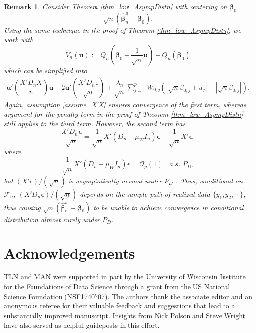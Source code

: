 \documentclass[ejs,authoryear,linksfromyear]{imsart}
\newcommand{\bnw}{\widehat{\bm{\beta}}_n^w} %
\numberwithin{equation}{section}
\theoremstyle{plain}
\newtheorem{remark}{Remark}[section]
\begin{document}
\begin{remark} \label{rmk_centering}
	Consider Theorem \ref{thm_low_AsympDistn} with centering on $\bm{\beta}_0$ 
	$$
	\sqrt{n} \left(
	\bnw - \bm{\beta}_0
	\right).
	$$     
	Using the same technique in the proof of Theorem \ref{thm_low_AsympDistn}, we work with
	$$
	V_n(\bm{u}) := 
	Q_n \left(
		\bm{\beta}_0 
		+ \dfrac{1}{\sqrt{n}} \bm{u}
	\right)
	- Q_n \left(
		\bm{\beta}_0 
	\right)
	$$
	which can be simplified into
	\begin{align*}
	\bm{u}' \left( \dfrac{X' D_n X}{n} \right) \bm{u} 
	-2 \bm{u}' \left( \dfrac{X' D_n \bm{\epsilon}}{\sqrt{n}} \right)
	+ \dfrac{\lambda_n}{ \sqrt{n} } 
	\sum_{j=1}^p W_{0,j}
	\left(
	\left|
	\sqrt{n} \beta_{0,j} + u_j
	\right|
	- \left|
	\sqrt{n} \beta_{0,j}
	\right|
	\right).
	\end{align*}
	Again, assumption \ref{assume_X'X} ensures convergence of the first term, whereas argument for the penalty term in the proof of Theorem \ref{thm_low_AsympDistn} still applies to the third term. However, the second term has
	$$
	\dfrac{X' D_n \bm{\epsilon}}{\sqrt{n}} 
	= \dfrac{1}{\sqrt{n}} X' 
	\left(
		D_n - \mu_W I_n
	\right)
	\bm{\epsilon}
	+ \dfrac{1}{\sqrt{n}} X' \bm{\epsilon},
	$$ 
	where 
	$$
	\dfrac{1}{\sqrt{n}} X' 
	\left(
	D_n - \mu_W I_n
	\right) \bm{\epsilon} = \mathcal{O}_p(1)
	\quad a.s. \,\, P_D,
	$$
	but $(X' \bm{\epsilon})/(\sqrt{n})$ is asymptotically normal under $P_D$ \citep{Knight&Fu}. Thus, conditional on $\mathcal{F}_n$, $(X' D_n \bm{\epsilon})/(\sqrt{n})$ depends on the sample path of realized data $\{y_1, y_2, \cdots \}$, thus causing $\sqrt{n} \left( \bnw - \bm{\beta}_0 \right)$ to be unable to achieve convergence in conditional distribution almost surely under $P_D$. 
\end{remark}

\section*{Acknowledgements}
TLN and MAN were  supported in part by the University of Wisconsin Institute for the Foundations of Data Science through a grant from the US National Science Foundation (NSF1740707). The authors thank the associate editor and an anonymous referee for their valuable feedback and suggestions that lead to a substantially improved manuscript. Insights from Nick Polson and Steve Wright have also served as helpful guideposts in this effort. 

	
         
\end{document}
